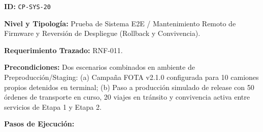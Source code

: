 \par\noindent \textbf{ID:} \texttt{CP-\allowbreak{}SYS-\allowbreak{}20}\par
\par\noindent \textbf{Nivel y Tipología:} Prueba de Sistema E2E / Mantenimiento Remoto de Firmware y Reversión de Despliegue (Rollback y Convivencia).\par
\par\noindent \textbf{Requerimiento Trazado:} RNF-011.\par
\par\noindent \textbf{Precondiciones:} Dos escenarios combinados en ambiente de Preproducción/Staging: (a) Campaña FOTA v2.1.0 configurada para 10 camiones propios detenidos en terminal; (b) Paso a producción simulado de release con 50 órdenes de transporte en curso, 20 viajes en tránsito y convivencia activa entre servicios de Etapa 1 y Etapa 2.\par
\par\noindent \textbf{Pasos de Ejecución:}\par
